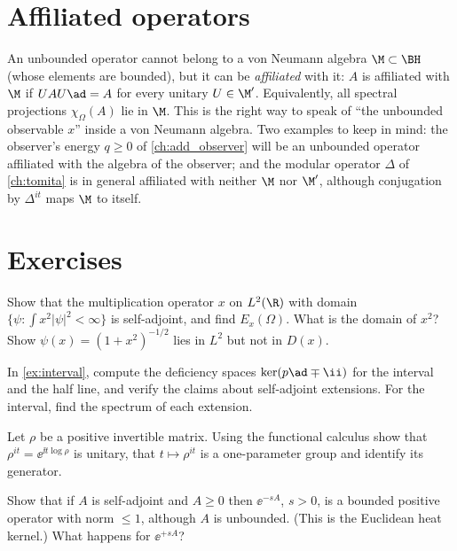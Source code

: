 \section{Affiliated operators}

An unbounded operator cannot belong to a von Neumann algebra $\M\subset\BH$ (whose elements are bounded), but it can be \emph{affiliated} with it: $A$ is affiliated with $\M$ if $UAU\ad=A$ for every unitary $U\in\M'$. Equivalently, all spectral projections $\chi_\Omega(A)$ lie in $\M$. This is the right way to speak of ``the unbounded observable $x$'' inside a von Neumann algebra. Two examples to keep in mind: the observer's energy $q\ge0$ of \cref{ch:add_observer} will be an unbounded operator affiliated with the algebra of the observer; and the modular operator $\Delta$ of \cref{ch:tomita} is in general affiliated with neither $\M$ nor $\M'$, although conjugation by $\Delta^{it}$ maps $\M$ to itself.

\section*{Exercises}
\begin{exercise}
Show that the multiplication operator $x$ on $L^2(\R)$ with domain $\{\psi:\int x^2|\psi|^2<\infty\}$ is self-adjoint, and find $E_x(\Omega)$. What is the domain of $x^2$? Show $\psi(x)=(1+x^2)^{-1/2}$ lies in $L^2$ but not in $D(x)$.
\end{exercise}
\begin{exercise}
In \cref{ex:interval}, compute the deficiency spaces $\ker(p\ad\mp\ii)$ for the interval and the half line, and verify the claims about self-adjoint extensions. For the interval, find the spectrum of each extension.
\end{exercise}
\begin{exercise}
Let $\rho$ be a positive invertible matrix. Using the functional calculus show that $\rho^{it}=\ee^{\ii t\log\rho}$ is unitary, that $t\mapsto\rho^{it}$ is a one-parameter group and identify its generator.
\end{exercise}
\begin{exercise}
Show that if $A$ is self-adjoint and $A\ge0$ then $\ee^{-sA}$, $s>0$, is a bounded positive operator with norm $\le1$, although $A$ is unbounded. (This is the Euclidean heat kernel.) What happens for $\ee^{+sA}$?
\end{exercise}
